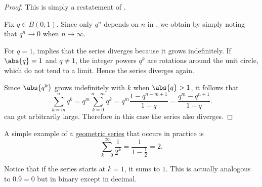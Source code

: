 \begin{proof}
   This is simply a restatement of .

   Fix \( q \in B(0, 1) \). Since only \( q^n \) depends on \( n \) in , we obtain  by simply noting that \( q^n \to 0 \) when \( n \to \infty \).

   For \( q = 1 \),  implies that the series diverges because it grows indefinitely. If \( \abs{q} = 1 \) and \( q \neq 1 \), the integer powers \( q^k \) are rotations around the unit circle, which do not tend to a limit. Hence the series diverges again.

  Since \( \abs{q^k} \) grows indefinitely with \( k \) when \( \abs{q} > 1 \), it follows that
  \begin{equation*}\label{thm:geometric_progression/cauchy_partial_sum}
    \sum_{k=m}^n q^k
    =
    q^m \sum_{k=0}^{n-m} q^k
    =
    q^m \frac {1 - q^{n-m+1}} {1 - q}
    =
    \frac {q^m - q^{n+1}} {1 - q}.
  \end{equation*}
  can get arbitrarily large. Therefore in this case the series also diverges.
\end{proof}

\begin{example}\label{ex:series_of_reciprocal_powers_of_two}
  A simple example of a \hyperref[def:geometric_progression/series]{geometric series} that occurs in practice is
  \begin{equation}\label{ex:series_of_reciprocal_powers_of_two/series}
    \sum_{k=0}^\infty \frac 1 {2^k} = \frac 1 {1 - \frac 1 2} = 2.
  \end{equation}

  Notice that if the series starts at \( k = 1 \), it sums to \( 1 \). This is actually analogous to \( 0.\overline{9} = 0 \) but in binary except in decimal.
\end{example}

